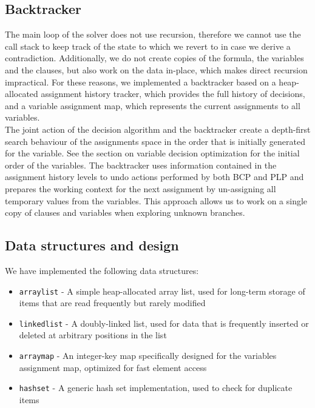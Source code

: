\documentclass[a4paper]{article}
\begin{document}
\subsection{Backtracker}

The main loop of the solver does not use recursion, therefore we cannot use the call stack to keep track of the state to which we revert to in case we derive a contradiction. Additionally, we do not create copies of the formula, the variables and the clauses, but also work on the data in-place, which makes direct recursion impractical. For these reasons, we implemented a backtracker based on a heap-allocated assignment history tracker, which provides the full history of decisions, and a variable assignment map, which represents the current assignments to all variables.\\

The joint action of the decision algorithm and the backtracker create a depth-first search behaviour of the assignments space in the order that is initially generated for the variable. See the section on variable decision optimization for the initial order of the variables. The backtracker uses information contained in the assignment history levels to undo actions performed by both BCP and PLP and prepares the working context for the next assignment by un-assigning all temporary values from the variables. This approach allows us to work on a single copy of clauses and variables when exploring unknown branches. 

\subsection{Data structures and design}

We have implemented the following data structures:

\begin{itemize}

\item \texttt{arraylist} - A simple heap-allocated array list, used for long-term storage of items that are read frequently but rarely modified

\item \texttt{linkedlist} - A doubly-linked list, used for data that is frequently inserted or deleted at arbitrary positions in the list

\item \texttt{arraymap} - An integer-key map specifically designed for the variables assignment map, optimized for fast element access

\item \texttt{hashset} - A generic hash set implementation, used to check for duplicate items

\end{itemize}
\end{document}
